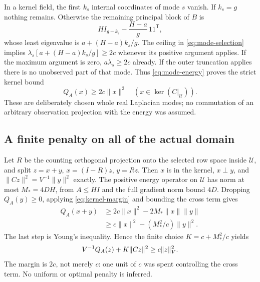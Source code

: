 In a kernel field, the first $k_s$ internal coordinates of mode $s$
vanish. If $k_s=g$ nothing remains. Otherwise the remaining principal
block of $B$ is
\[
 H I_{g-k_s}-\frac{H-a}{g}\,11^{\mathsf T},
\]
whose least eigenvalue is $a+(H-a)k_s/g$. The ceiling in
\eqref{eq:mode-selection} implies
$\lambda_s[a+(H-a)k_s/g]\ge2c$ whenever its positive argument applies.
If the maximum argument is zero, $a\lambda_s\ge2c$ already.
If the outer truncation applies there is no unobserved part of that mode.
Thus \eqref{eq:mode-energy} proves the strict kernel bound
\begin{equation}\label{eq:kernel-margin}
 Q_A(x)\ge2c\|x\|^2\quad(x\in\ker(C|_{\mathcal U})).
\end{equation}
These are deliberately chosen whole real Laplacian modes; no commutation
of an arbitrary observation projection with the energy was assumed.

\subsection{A finite penalty on all of the actual domain}
Let $R$ be the counting orthogonal projection onto the selected row space
inside $\mathcal U$, and split $z=x+y$, $x=(I-R)z$, $y=Rz$.
Then $x$ is in the kernel, $x\perp y$, and
$\|Cz\|^2=V^{-1}\|y\|^2$ exactly.
The positive energy operator on $\mathcal U$ has norm at most
$M_*=4DH$, from $A\le HI$ and the full gradient norm bound $4D$.
Dropping $Q_A(y)\ge0$, applying \eqref{eq:kernel-margin} and bounding
the cross term gives
\begin{align*}
 Q_A(x+y)&\ge2c\|x\|^2-2M_*\|x\|\|y\|\\
 &\ge c\|x\|^2-(M_*^2/c)\|y\|^2.
\end{align*}
The last step is Young's inequality. Hence the finite choice
$K=c+M_*^2/c$ yields
\[
 V^{-1}Q_A(z)+K\|Cz\|^2\ge c\|z\|_{V}^2.
\]
The margin is $2c$, not merely $c$: one unit of $c$ was spent controlling
the cross term. No uniform or optimal penalty is inferred.

